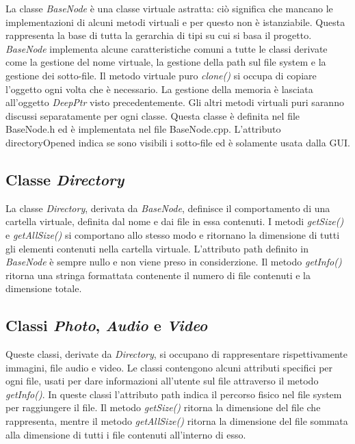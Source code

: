 La classe \emph{BaseNode} è una classe virtuale astratta: ciò significa 
che mancano le implementazioni di alcuni metodi virtuali e per questo 
non è istanziabile. Questa rappresenta la base di tutta la gerarchia di
tipi su cui si basa il progetto. \emph{BaseNode} implementa alcune
caratteristiche comuni a tutte le classi derivate come la gestione del nome
virtuale, la gestione della path sul file system e la gestione dei sotto-file.
Il metodo virtuale puro \emph{clone()} si occupa di copiare l'oggetto
ogni volta che è necessario. La gestione della memoria è lasciata all'oggetto
\emph{DeepPtr} visto precedentemente. Gli altri metodi virtuali puri saranno 
discussi separatamente per ogni classe. Questa classe è definita nel file BaseNode.h ed è implementata nel file BaseNode.cpp.
L'attributo directoryOpened indica se sono visibili i sotto-file ed è solamente usata dalla GUI.

\subsection{Classe \emph{Directory}}

La classe \emph{Directory}, derivata da \emph{BaseNode}, definisce il comportamento di una cartella virtuale,
definita dal nome e dai file in essa contenuti. I metodi \emph{getSize()} e \emph{getAllSize()}
si comportano allo stesso modo e ritornano la dimensione di tutti gli elementi contenuti nella cartella virtuale.
L'attributo path definito in \emph{BaseNode} è sempre nullo e non viene preso in considerzione. 
Il metodo \emph{getInfo()} ritorna una stringa formattata contenente il numero di file contenuti e la dimensione totale.

\subsection{Classi \emph{Photo}, \emph{Audio} e \emph{Video}}

Queste classi, derivate da \emph{Directory}, si occupano di rappresentare rispettivamente immagini, file audio e video.
Le classi contengono alcuni attributi specifici per ogni file, usati per dare informazioni all'utente sul file attraverso il metodo \emph{getInfo()}.
In queste classi l'attributo path indica il percorso fisico nel file system per raggiungere il file. 
Il metodo \emph{getSize()} ritorna la dimensione del file che rappresenta, mentre il metodo \emph{getAllSize()}
ritorna la dimensione del file sommata alla dimensione di tutti i file contenuti all'interno di esso.

